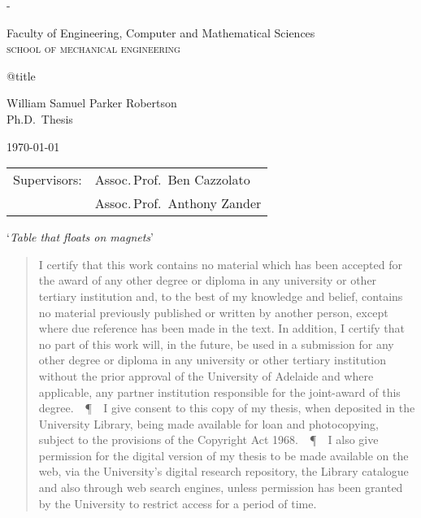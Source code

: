 
\pagestyle{empty}
\label{titlepage}
\calccentering{\unitlength}
\begin{adjustwidth*}{\unitlength}{-\unitlength}
\setlength{\parindent}{0pt}

\begin{flushright}
\end{flushright}

\vfill

Faculty of Engineering,
Computer and Mathematical Sciences\\
\textsc{school of mechanical engineering}

\vfill

{\Large\raggedright\csname @title\endcsname}

\vspace{10mm}

William Samuel Parker Robertson\\
Ph.D.\ Thesis
\vspace{10mm}

\today

\vfill

\vfill

\begin{tabular}{@{}ll}
Supervisors:    & Assoc.\,Prof.\ Ben Cazzolato  \\
                & Assoc.\,Prof.\ Anthony Zander
\end{tabular}
\end{adjustwidth*}

\cleardoublepage

\def\PPP{\unskip~\,\textup\P~\,}
\small
\null
\begin{center}
\Large`\textit{Table that floats on magnets}'
\end{center}
\begin{quote}
\nonfrenchspacing
\parfillskip=0pt
I certify that this work contains no material which has been accepted for the award of any other degree or diploma in any university or other tertiary institution and, to the best of my knowledge and belief, contains no material previously published or written by another person, except where due reference has been made in the text. In addition, I certify that no part of this work will, in the future, be used in a submission for any other degree or diploma in any university or other tertiary institution without the prior approval of the University of Adelaide and where applicable, any partner institution responsible for the joint-award of this degree.
\PPP
I give consent to this copy of my thesis, when deposited in the University Library, being made available for loan and photocopying, subject to the provisions of the Copyright Act 1968.
\PPP
I also give permission for the digital version of my thesis to be made available on the web, via the University’s digital research repository, the Library catalogue and also through web search engines, unless permission has been granted by the University to restrict access for a period of time.
\end{quote}
\vfill

